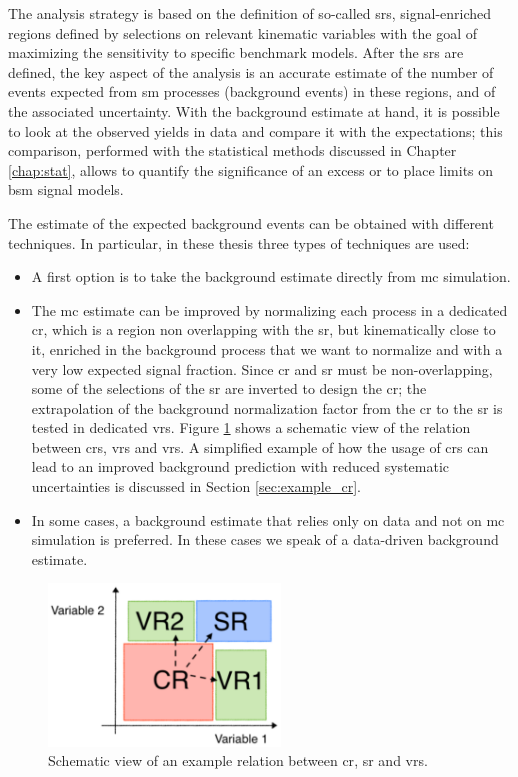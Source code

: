 The analysis strategy is based on the definition of so-called \glspl{sr}, signal-enriched regions defined by selections on relevant kinematic variables with the goal of maximizing the sensitivity to specific benchmark models. 
After the \glspl{sr} are defined, the key aspect of the analysis is an accurate estimate of the number of events expected from \gls{sm} processes (background events) in these regions, and of the associated uncertainty. 
With the background estimate at hand, it is possible to look at the observed yields in data and compare it with the expectations;
this comparison, performed with the statistical methods discussed in Chapter \ref{chap:stat}, allows to quantify the significance of an excess or to place  limits on \gls{bsm} signal models.

The estimate of the expected background events can be obtained with different techniques. In particular, in these thesis three types of techniques are used:
\begin{itemize}
\item A first option is to take the background estimate directly from \gls{mc} simulation. 
\item The \gls{mc} estimate can be improved by normalizing each process in a dedicated \gls{cr}, which is a region non overlapping with the \gls{sr}, but kinematically close to it, enriched in the background process that we want to normalize and with a very low expected signal fraction. Since \gls{cr} and \gls{sr} must be non-overlapping, some of the selections of the \gls{sr} are inverted to design the \gls{cr}; the extrapolation of the background normalization factor from the \gls{cr} to the \gls{sr} is tested in dedicated \glspl{vr}. Figure \ref{fig:susy_common:CRschema} shows a schematic view of the relation between \glspl{cr}, \glspl{vr} and \glspl{vr}. A simplified example of how the usage of \glspl{cr} can lead to an improved background prediction with reduced systematic uncertainties is discussed in Section \ref{sec:example_cr}. 
\item In some cases, a background estimate that relies only on data and not on \gls{mc} simulation is preferred. In these cases we speak of a data-driven background estimate.
\end{itemize}

\begin{figure}
\centering
\includegraphics[width=0.55\textwidth]{figures/Chap7/Rizzi-Fig7-1.pdf}
\caption{Schematic view of an example relation between \gls{cr}, \gls{sr} and \glspl{vr}.}
\label{fig:susy_common:CRschema}
\end{figure}
 
